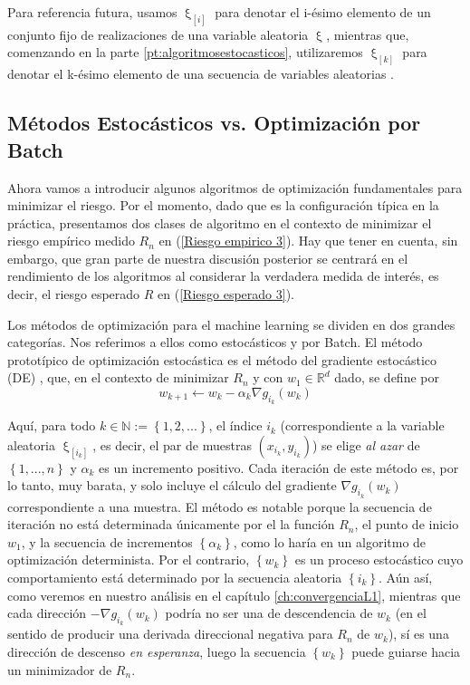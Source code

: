 Para referencia futura, usamos $\upxi_{\left [ i \right ]}$ para denotar el i-\'esimo elemento de un conjunto fijo de realizaciones de una variable aleatoria $\upxi$, mientras que, comenzando en la parte \ref{pt:algoritmosestocasticos}, utilizaremos $\upxi_{\left [ k \right ]}$ para denotar el k-\'esimo elemento de una secuencia de variables aleatorias .

\subsection{M\'etodos Estoc\'asticos vs. Optimizaci\'on por Batch}
Ahora vamos a introducir algunos algoritmos de optimizaci\'on fundamentales para minimizar el riesgo. Por el momento, dado que es la configuraci\'on t\'ipica en la pr\'actica, presentamos dos clases de algoritmo en el contexto de minimizar el riesgo emp\'irico medido $R_n$ en (\ref{Riesgo empirico 3}). Hay que tener en cuenta, sin embargo, que gran parte de nuestra discusi\'on posterior se centrar\'a en el rendimiento de los algoritmos al considerar la verdadera medida de inter\'es, es decir, el riesgo esperado $R$ en (\ref{Riesgo esperado 3}).

Los m\'etodos de optimizaci\'on para el machine learning se dividen en dos grandes categor\'ias. Nos referimos a ellos como estoc\'asticos y por Batch. El m\'etodo protot\'ipico de optimizaci\'on estoc\'astica es el m\'etodo del gradiente estoc\'astico (DE) \cite{robbins:1951}, que, en el contexto de minimizar $R_n$ y con $w_1\in \mathbb{R}^d$ dado, se define por
\begin{equation}
\label{def: DE}
w_{k+1} \gets w_k - \alpha_k \nabla g_{i_k} (w_k)
\end{equation}

Aqu\'i, para todo $k \in \mathbb{N} := \left\lbrace 1, 2, ... \right\rbrace $, el \'indice $i_k$ (correspondiente a la variable aleatoria $\upxi_{\left[ i_k \right]}$, es decir, el par de muestras $(x_{i_k}, y_{i_k})$) se elige \textit{al azar} de $\left\lbrace 1,. . . , n \right\rbrace$ y $\alpha _k$ es un incremento positivo. Cada iteraci\'on de este m\'etodo es, por lo tanto, muy barata, y solo incluye el c\'alculo del gradiente $\nabla g_{i_k} (w_k)$ correspondiente a una muestra. El m\'etodo es notable porque la secuencia de iteraci\'on no est\'a determinada \'unicamente por el
	la funci\'on $R_n$, el punto de inicio $w_1$, y la secuencia de incrementos $\left\lbrace \alpha _k \right\rbrace $, como lo har\'ia en un algoritmo de optimizaci\'on determinista. Por el contrario, $\left\lbrace w_k \right\rbrace $ es un proceso estoc\'astico cuyo comportamiento est\'a determinado por la secuencia aleatoria $\left\lbrace i_k \right\rbrace $. A\'un as\'i, como veremos en nuestro an\'alisis en el cap\'itulo \ref{ch:convergenciaL1}, mientras que cada direcci\'on $- \nabla g_{i_k} (w_k)$ podr\'ia no ser una de descendencia de $w_k$ (en el sentido de producir una derivada direccional negativa para $R_n$ de $w_k$), s\'i es una direcci\'on de descenso \textit{en esperanza}, luego la secuencia $\left\lbrace w_k \right\rbrace $ puede guiarse hacia un minimizador de $R_n$.
	

